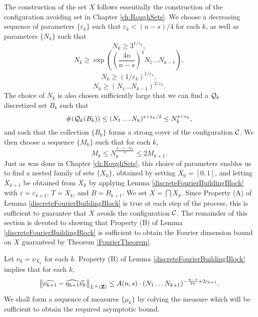 \begin{comment}
    Combining \eqref{fourierdim1}, \eqref{fourierdim2}, and \eqref{fourierdim3}, we conclude that there exists a constant $C$ such that with probability at least
    \[ 1 - 2 \exp \left( \frac{-N^{d-s/n}}{A^{1/n} (\log N)^{1/n}} \right) - 1/\log N - \frac{2^{d+1}}{N^{c \log N - d}} \geq 1 - C / \log N, \]
    the set $X$ avoids $K$, and for all $m \in \{ -N, \dots, N \}^d$,
    \[ |\widehat{f}(m)| \leq \frac{C (\log N)^{1-1/n}}{N^{d-s/n}}. \qedhere \]
\end{proof}
\end{comment}

The construction of the set $X$ follows essentially the construction of the configuration avoiding set in Chapter \ref{ch:RoughSets}. We choose a decreasing sequence of parameters $\{ \varepsilon_k \}$ such that $\varepsilon_k < (n-s)/4$ for each $k$, as well as parameters $\{ N_k \}$ such that
%
\[ N_k \geq 3^{1/\varepsilon_k}, \]
%
\[ N_k \geq \exp \left( \left( \frac{4n}{n-s} \right)^4 N_1 \dots N_{k-1} \right), \]
%
\[ N_k \geq (1/\varepsilon_k)^{1/\varepsilon_k}, \]
%
\begin{equation} \label{equation13895891489132}
    N_k \geq (N_1 \dots N_{k-1})^{2/\varepsilon_k}.
\end{equation}
%
The choice of $N_k$ is also chosen sufficiently large that we can find a $\operatorname{\mathcal{Q}}_k$ discretized set $B_k$ such that
%
\[ \#(\operatorname{\mathcal{Q}}_k(B_k)) \leq (N_1 \dots N_k)^{s + \varepsilon_k/2} \leq N_k^{s + \varepsilon_k}, \]
%
and such that the collection $\{ B_k \}$ forms a strong cover of the configuration $\operatorname{\mathcal{C}}$. We then choose a sequence $\{ M_k \}$  such that for each $k$,
%
\[ M_k \leq N_k^{\frac{n-s-2\varepsilon_k}{n}} \leq 2 M_{k+1}. \]
%
Just as was done in Chapter \ref{ch:RoughSets}, this choice of parameters enables us to find a nested family of sets $\{ X_k \}$, obtained by setting $X_0 = [0,1]$, and letting $X_{k+1}$ be obtained from $X_k$ by applying Lemma \ref{discreteFourierBuildingBlock} with $\varepsilon = \varepsilon_{k+1}$, $T = X_k$, and $B = B_{k+1}$. We set $X = \bigcap X_k$. Since Property (A) of Lemma \eqref{discreteFourierBuildingBlock} is true at each step of the process, this is sufficient to guarantee that $X$ avoids the configuration $\operatorname{\mathcal{C}}$. The remainder of this section is devoted to showing that Property (B) of Lemma \ref{discreteFourierBuildingBlock} is sufficient to obtain the Fourier dimension bound on $X$ guaranteed by Theorem \ref{FourierTheorem}.

Let $\nu_k = \nu_{X_k}$ for each $k$. Property (B) of Lemma \ref{discreteFourierBuildingBlock} implies that for each $k$,
%
\begin{equation} \label{equation77770123091293120}
    \left\| \widehat{\nu_{k+1}} - \widehat{\eta_{k+1}} \widehat{\nu_k} \right\|_{L^\infty(\operatorname{\mathbf{Z}})} \leq A(n,s) \cdot (N_1 \dots N_{k+1})^{- \frac{n-s}{2n} + 2\varepsilon_{k+1}}.
\end{equation}
%
We shall form a sequence of measures $\{ \mu_k \}$ by colving the measure which will be sufficient to obtain the required asymptotic bound.

